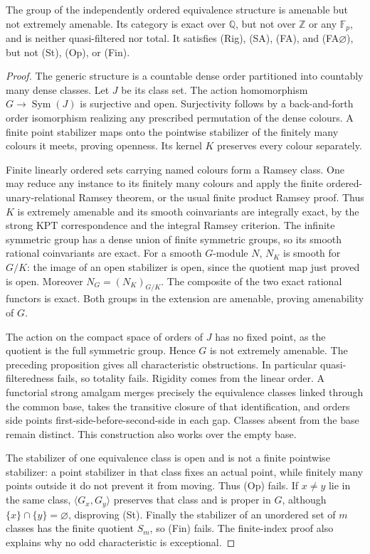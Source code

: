\begin{proposition}
\label{A:equivalence-rational}
The group of the independently ordered equivalence structure is
amenable but not extremely amenable. Its category is exact over
$\mathbb Q$, but not over $\mathbb Z$ or any $\mathbb F_p$, and is
neither quasi-filtered nor total. It satisfies (Rig), (SA), (FA), and
(FA$\varnothing$), but not (St), (Op), or (Fin).
\end{proposition}
\begin{proof}
The generic structure is a countable dense order partitioned into
countably many dense classes. Let $J$ be its class set. The action
homomorphism $G\to\operatorname{Sym}(J)$ is surjective and open.
Surjectivity follows by a back-and-forth order isomorphism realizing
any prescribed permutation of the dense colours. A finite point
stabilizer maps onto the pointwise stabilizer of the finitely many
colours it meets, proving openness. Its kernel $K$ preserves every
colour separately.

Finite linearly ordered sets carrying named colours form a Ramsey
class. One may reduce any instance to its finitely many colours and
apply the finite ordered-unary-relational Ramsey theorem, or the
usual finite product Ramsey proof. Thus $K$ is extremely amenable
and its smooth coinvariants are integrally exact, by the strong KPT
correspondence and the integral Ramsey criterion. The infinite
symmetric group has a dense union of finite symmetric groups, so
its smooth rational coinvariants are exact. For a smooth $G$-module
$N$, $N_K$ is smooth for $G/K$: the image of an open stabilizer is
open, since the quotient map just proved is open. Moreover
$N_G=(N_K)_{G/K}$. The composite of the two exact rational functors
is exact. Both groups in the extension are amenable, proving
amenability of $G$.

The action on the compact space of orders of $J$ has no fixed point,
as the quotient is the full symmetric group. Hence $G$ is not
extremely amenable. The preceding proposition gives all
characteristic obstructions. In particular quasi-filteredness fails,
so totality fails. Rigidity comes from the linear order. A functorial
strong amalgam merges precisely the equivalence classes linked
through the common base, takes the transitive closure of that
identification, and orders side points first-side-before-second-side
in each gap. Classes absent from the base remain distinct. This
construction also works over the empty base.

The stabilizer of one equivalence class is open and is not a finite
pointwise stabilizer: a point stabilizer in that class fixes an
actual point, while finitely many points outside it do not prevent
it from moving. Thus (Op) fails. If $x\ne y$ lie in the same class,
$\langle G_x,G_y\rangle$ preserves that class and is proper in $G$,
although $\{x\}\cap\{y\}=\varnothing$, disproving (St). Finally the
stabilizer of an unordered set of $m$ classes has the finite quotient
$S_m$, so (Fin) fails. The finite-index proof also explains why no
odd characteristic is exceptional.
\end{proof}

